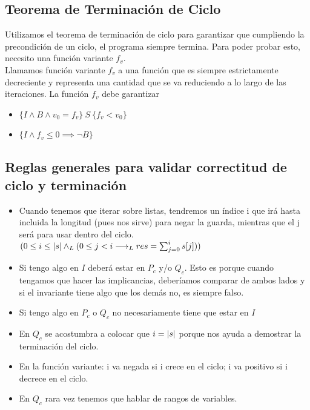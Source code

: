 \documentclass[10pt,a4paper]{article}
\begin{document}
\subsection*{Teorema de Terminación de Ciclo}
Utilizamos el teorema de terminación de ciclo para garantizar que cumpliendo la precondición de un ciclo, el programa siempre termina.
Para poder probar esto, necesito una función variante \(f_{v}\). \\
Llamamos función variante \(f_{v}\) a una función que es siempre estrictamente decreciente y representa una cantidad que se va reduciendo a lo largo de las iteraciones.
La función \(f_{v}\) debe garantizar
\begin{itemize}
    \item \(\{I \land B \land v_{0} = f_{v}\} \ S \ \{f_{v} < v_{0}\}\)
    \item \(\{I  \land f_{v} \le 0 \implies \neg B\}\)
   
\end{itemize}
\subsection*{Reglas generales para validar correctitud de ciclo y terminación}
\begin{itemize}
    \item Cuando tenemos que iterar sobre listas, tendremos un índice i que irá hasta incluida la longitud (pues nos sirve) para negar la guarda, mientras que el j será para usar dentro del ciclo. 
    \((0\le i \le |s| \land _L (0 \le j < i \longrightarrow _L res = \sum_{j=0}^{i}{s[j]}))\)
    \item Si tengo algo en \(I\) deberá estar en \(P_{c}\) y/o \(Q_{c}\). Esto es porque cuando tengamos que hacer las implicancias, deberíamos comparar de ambos lados y si el invariante tiene algo que los demás no, es siempre falso. 
    \item Si tengo algo en \(P_{c}\) o \(Q_{c}\) no necesariamente tiene que estar en \(I\)
    \item En \(Q_{c}\) se acostumbra a colocar que \(i = |s|\) porque nos ayuda a demostrar la terminación del ciclo.
    \item En la función variante: i va negada si i crece en el ciclo; i va positivo si i decrece en el ciclo.
    \item En \(Q_{c}\) rara vez tenemos que hablar de rangos de variables.
\end{itemize} 
\end{document}
